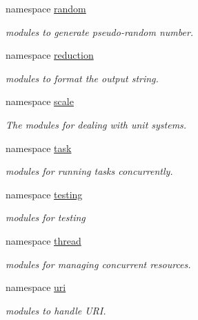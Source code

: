 \begin{DoxyCompactItemize}
namespace \hyperlink{namespacehryky_1_1random}{random}
\begin{DoxyCompactList}\small\item\em modules to generate pseudo-\/random number. \end{DoxyCompactList}\item 
namespace \hyperlink{namespacehryky_1_1reduction}{reduction}
\begin{DoxyCompactList}\small\item\em modules to format the output string. \end{DoxyCompactList}\item 
namespace \hyperlink{namespacehryky_1_1scale}{scale}
\begin{DoxyCompactList}\small\item\em The modules for dealing with unit systems. \end{DoxyCompactList}\item 
namespace \hyperlink{namespacehryky_1_1task}{task}
\begin{DoxyCompactList}\small\item\em modules for running tasks concurrently. \end{DoxyCompactList}\item 
namespace \hyperlink{namespacehryky_1_1testing}{testing}
\begin{DoxyCompactList}\small\item\em modules for testing \end{DoxyCompactList}\item 
namespace \hyperlink{namespacehryky_1_1thread}{thread}
\begin{DoxyCompactList}\small\item\em modules for managing concurrent resources. \end{DoxyCompactList}\item 
namespace \hyperlink{namespacehryky_1_1uri}{uri}
\begin{DoxyCompactList}\small\item\em modules to handle U\-R\-I. \end{DoxyCompactList}\end{DoxyCompactItemize}
